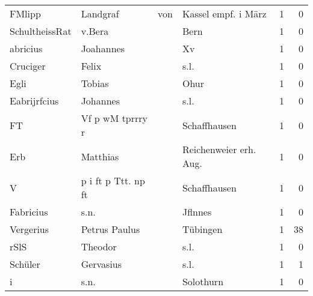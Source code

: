\begin{center}
\begin{tiny}
\begin{longtabu}{llllrr}
                   FMlipp &                           Landgraf &         von &                         Kassel empf. i März &          1 &         0 \\
           SchultheissRat &                             v.Bera &             &                                        Bern &          1 &         0 \\
                 abricius &                          Joahannes &             &                                          Xv &          1 &         0 \\
                 Cruciger &                              Felix &             &                                        s.l. &          1 &         0 \\
                     Egli &                             Tobias &             &                                        Ohur &          1 &         0 \\
             Eabrijrfcius &                           Johannes &             &                                        s.l. &          1 &         0 \\
                       FT &                   Vf p wM tprrry r &             &                                Schaffhausen &          1 &         0 \\
                      Erb &                           Matthias &             &                     Reichenweier erh. Aug.  &          1 &         0 \\
                        V &                p i ft p Ttt. np ft &             &                                Schaffhausen &          1 &         0 \\
                Fabricius &                               s.n. &             &                                     Jflnnes &          1 &         0 \\
                Vergerius &                      Petrus Paulus &             &                                    Tübingen &          1 &        38 \\
                     rSlS &                            Theodor &             &                                        s.l. &          1 &         0 \\
                  Schüler &                          Gervasius &             &                                        s.l. &          1 &         1 \\
                        i &                               s.n. &             &                                   Solothurn &          1 &         0 \\

\end{longtabu}
\end{tiny}
\end{center}
